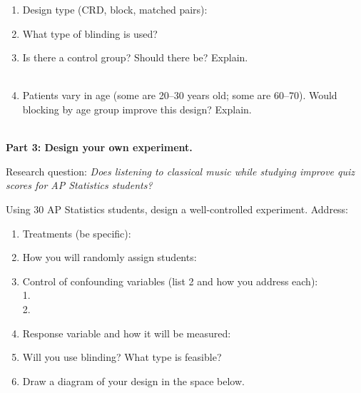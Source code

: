 \documentclass[10pt]{article}
\begin{document}
\begin{practicebox}
\small
\begin{enumerate}[leftmargin=1.5em, itemsep=7pt]
  \item Design type (CRD, block, matched pairs): \blank{6cm}
  \item What type of blinding is used? \blank{6cm}
  \item Is there a control group? \blank{3cm} Should there be? Explain.\\
        \writeline\\[1pt]\writeline
  \item Patients vary in age (some are 20--30 years old; some are 60--70). Would
        blocking by age group improve this design? Explain.\\
        \writeline\\[1pt]\writeline
\end{enumerate}
\end{practicebox}

\vspace{0.1in}

\textbf{Part 3: Design your own experiment.}

\begin{practicebox}
\small
Research question: \textit{Does listening to classical music while studying improve
quiz scores for AP Statistics students?}

\vspace{6pt}
Using 30 AP Statistics students, design a well-controlled experiment. Address:
\begin{enumerate}[leftmargin=1.5em, itemsep=6pt]
  \item Treatments (be specific): \blank{9cm}
  \item How you will randomly assign students: \blank{9cm}
  \item Control of confounding variables (list 2 and how you address each):\\
        1. \blank{9cm}\\[4pt]
        2. \blank{9cm}
  \item Response variable and how it will be measured: \blank{9cm}
  \item Will you use blinding? What type is feasible? \blank{9cm}
  \item Draw a diagram of your design in the space below.
  \vspace{1.6in}
\end{enumerate}
\end{practicebox}
\end{document}
